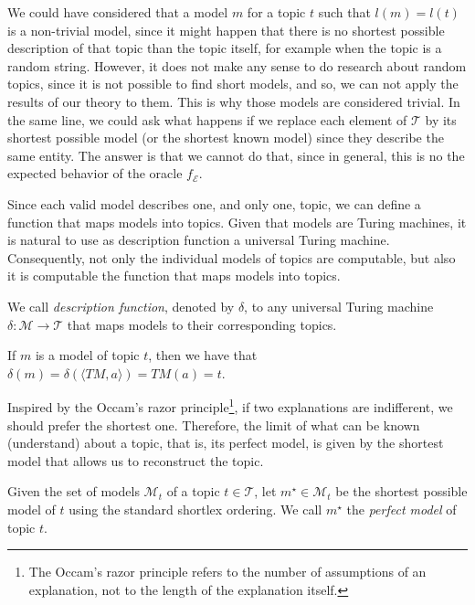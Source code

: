 We could have considered that a model $m$ for a topic $t$ such that $l(m) = l(t)$ is a non-trivial model, since it might happen that there is no shortest possible description of that topic than the topic itself, for example when the topic is a random string. However, it does not make any sense to do research about random topics, since it is not possible to find short models, and so, we can not apply the results of our theory to them. This is why those models are considered trivial. In the same line, we could ask what happens if we replace each element of $\mathcal{T}$ by its shortest possible model (or the shortest known model) since they describe the same entity. The answer is that we cannot do that, since in general, this is no the expected behavior of the oracle $f_\mathcal{E}$.

Since each valid model describes one, and only one, topic, we can define a function that maps models into topics. Given that models are Turing machines, it is natural to use as description function a universal Turing machine. Consequently, not only the individual models of topics are computable, but also it is computable the function that maps models into topics.

\begin{definition}
We call \emph{description function}, denoted by $\delta$, to any universal Turing machine $\delta : \mathcal{M} \rightarrow \mathcal{T}$ that maps models to their corresponding topics.
\end{definition}

If $m$ is a model of topic $t$, then we have that $\delta \left( m \right) = \delta \left( \langle TM,a\rangle \right) = TM(a) = t$.

Inspired by the Occam's razor principle\footnote{The Occam's razor principle refers to the number of assumptions of an explanation, not to the length of the explanation itself.}, if two explanations are indifferent, we should prefer the shortest one. Therefore, the limit of what can be known (understand) about a topic, that is, its perfect model, is given by the shortest model that allows us to reconstruct the topic.

\begin{definition}
\label{def:descriptions_perfect_model}
Given the set of models $\mathcal{M}_t$ of a topic $t \in \mathcal{T}$, let $m^{\star} \in \mathcal{M}_t$ be the shortest possible model of $t$ using the standard shortlex ordering. We call $m^{\star}$ the \emph{perfect model} of topic $t$.
\end{definition}

